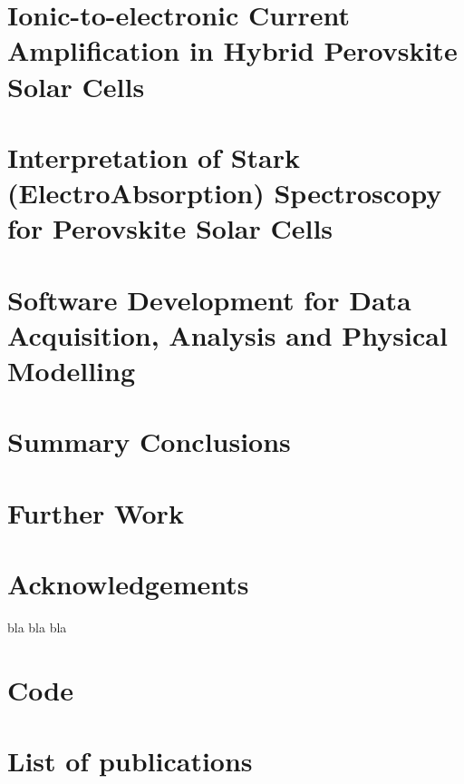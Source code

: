 \documentclass[b5paper, 12pt, openright]{book} %
\begin{document}
\chapter{Ionic-to-electronic Current Amplification in Hybrid Perovskite Solar Cells}
	\graphicspath{ {./contents_img/impedance/} }
	
	
\chapter{Interpretation of Stark (ElectroAbsorption) Spectroscopy for Perovskite Solar Cells}
	\graphicspath{ {./contents_img/electroabsorption/} }
	

\chapter{Software Development for Data Acquisition, Analysis and Physical Modelling}
	\graphicspath{ {./contents_img/software/} }
	

\chapter{Summary Conclusions}


\chapter{Further Work}


\chapter*{Acknowledgements}
bla bla bla

\appendix
\chapter{Code}


\chapter{List of publications}

\printindex

\printbibliography
\end{document}

